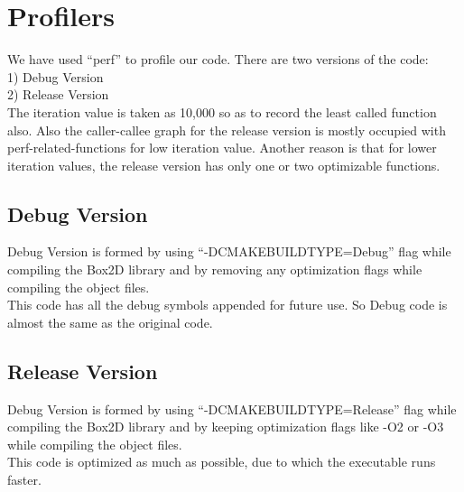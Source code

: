 \documentclass[11pt]{article}
\begin{document}
\newpage
\section{Profilers}
We have used ``perf'' \cite{perf} \cite{prof} to profile our code. There are two versions of the code:\\
1) Debug Version \\
2) Release Version \\
The iteration value is taken as 10,000 so as to record the least called function also.
Also the caller-callee graph for the release version is mostly occupied with perf-related-functions for low iteration value. Another reason is that for lower iteration values, the release version has only one or two optimizable functions.

\subsection{Debug Version}
Debug Version is formed by using ``-DCMAKE\textunderscore BUILD\textunderscore TYPE=Debug'' flag while compiling the Box2D library and by removing any optimization flags while compiling the object files.\\
This code has all the debug symbols appended for future use.
So Debug code is almost the same as the original code.

\subsection{Release Version}
Debug Version is formed by using ``-DCMAKE\textunderscore BUILD\textunderscore TYPE=Release'' flag while compiling the Box2D library and by keeping optimization flags like -O2 or -O3 while compiling the object files.\\
This code is optimized as much as possible, due to which the executable runs faster.
\end{document}
